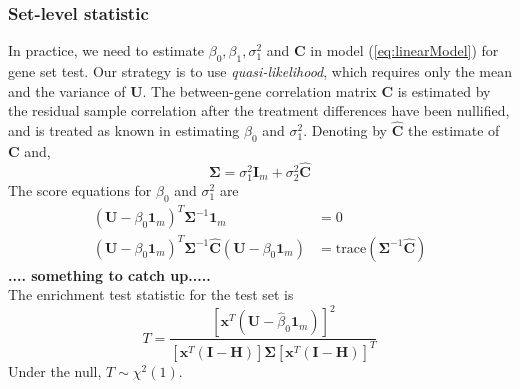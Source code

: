 \documentclass[useAMS,usenatbib, galley]{biom}
\newcommand{\OurMethod}{MEQLEA}
\begin{document}
	\subsubsection{Set-level statistic}\label{subsection:setlevelstat}
	In practice, we need to estimate $\beta_0, \beta_1,\sigma_1^2$ and $\bm C$ in model (\ref{eq:linearModel}) for gene set test. Our strategy is to use \textit{quasi-likelihood}, which requires only the mean and the variance of $\bm U$.  The between-gene correlation matrix $\bm C$ is estimated by the residual sample correlation after the treatment differences have been nullified, and is treated as known in estimating $\beta_0$ and $\sigma_1^2$. 
	Denoting by $\hat{\bm C}$ the estimate of $\bm C$ and,
	\begin{equation}\label{eq:estimateparameter}
	\bm\Sigma = \sigma^2_1\bm I_m + \sigma_2^2 \hat{\bm C}
	\end{equation}
	The score equations for $\beta_0$ and $\sigma_1^2$ are
	\begin{equation}
	\begin{aligned}
	(\bm U - \beta_0\bm 1_m)^T \bm \Sigma^{-1}\bm 1_m & = 0\\
	(\bm U - \beta_0\bm 1_m)^T \bm \Sigma^{-1} \hat{\bm C} (\bm U - \beta_0\bm 1_m) &= \text{trace}(\bm \Sigma^{-1}\hat{\bm C})
	\end{aligned}
	\end{equation}
	\textbf{.... something to catch up.....}\\
	The enrichment test statistic for the test set is 
	\begin{equation}\label{eq:teststatistic}
	T = \frac{\left[\bm x^T(\bm U - \hat{\beta}_0 \bm 1_m )\right]^2}{\left[\bm x^T(\bm I - \bm H)\right]\bm \Sigma \left[\bm x^T(\bm I - \bm H)\right]^T}
	\end{equation} 
	Under the null, $T\sim \chi^2(1)$.
	
	
	
\end{document}
